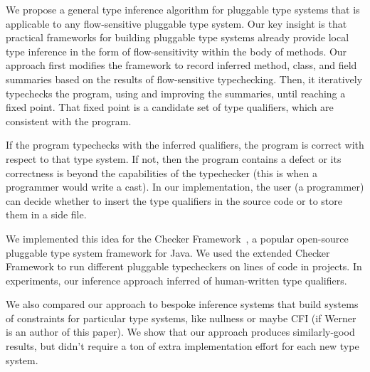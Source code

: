 %
%

We propose a general type inference algorithm for pluggable type
systems that is applicable to any flow-sensitive pluggable type system.
Our key insight is that
practical frameworks for building pluggable type systems already provide
local type inference in the form of flow-sensitivity within the body
of methods.
Our approach first
modifies the framework to record inferred method, class, and field summaries
based on the results of flow-sensitive typechecking.
Then, it iteratively typechecks the program, using and improving the
summaries, until reaching a fixed point.
That fixed point is a candidate set of type qualifiers, which are
consistent with the program.

If the program typechecks with the inferred qualifiers, the program
is correct with respect to that type system.
If not, then the program contains a defect
or its correctness is beyond the capabilities of the
typechecker (this is when a programmer would write a cast).
In our implementation, the user (a programmer) can decide whether to insert
the type qualifiers in the source code or to store them in a side file.

We implemented this idea for the Checker Framework~\cite{PapiACPE2008},
a popular open-source pluggable type system
framework for Java.
%
%
We used the extended Checker Framework to run \numTypeSystems different pluggable typecheckers
on \numLOC lines of code in \numProjects projects.
In experiments, our inference approach inferred \percentInferred of human-written
type qualifiers.

We also compared our approach to bespoke inference systems that build
systems of constraints for particular type systems, like nullness or
maybe CFI (if Werner is an author of this paper). We show that our approach
produces similarly-good results, but didn't require a ton of extra
implementation effort for each new type system.

